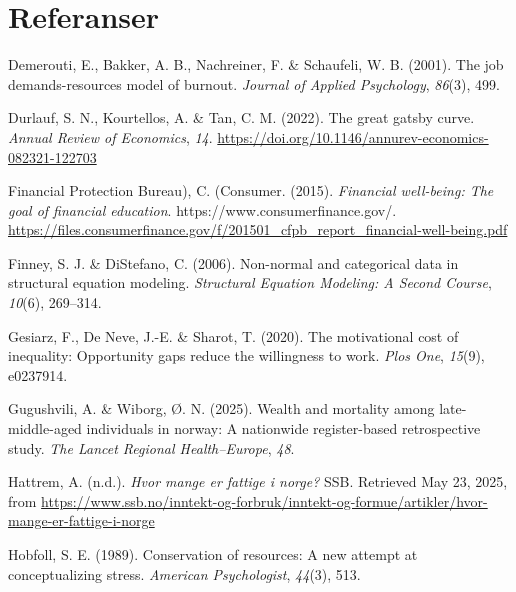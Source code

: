 \documentclass[
  12pt,
  a4paper,
  DIV=11,
  numbers=noendperiod]{scrartcl}
\newlength{\cslhangindent}
\newenvironment{CSLReferences}[2] %
 {\begin{list}{}{%
  \setlength{\itemindent}{0pt}
  \setlength{\leftmargin}{0pt}
  \setlength{\parsep}{0pt}
  \ifodd #1
   \setlength{\leftmargin}{\cslhangindent}
   \setlength{\itemindent}{-1\cslhangindent}
  \fi
  \setlength{\itemsep}{#2\baselineskip}}}
 {\end{list}}
\begin{document}
\newpage

\section*{Referanser}\label{referanser}

\label{refs}
\begin{CSLReferences}{1}{0}
Demerouti, E., Bakker, A. B., Nachreiner, F. \& Schaufeli, W. B. (2001).
The job demands-resources model of burnout. \emph{Journal of Applied
Psychology}, \emph{86}(3), 499.

Durlauf, S. N., Kourtellos, A. \& Tan, C. M. (2022). The great gatsby
curve. \emph{Annual Review of Economics}, \emph{14}.
\url{https://doi.org/10.1146/annurev-economics-082321-122703}

Financial Protection Bureau), C. (Consumer. (2015). \emph{Financial
well-being: The goal of financial education}.
https://www.consumerfinance.gov/.
\url{https://files.consumerfinance.gov/f/201501_cfpb_report_financial-well-being.pdf}

Finney, S. J. \& DiStefano, C. (2006). Non-normal and categorical data
in structural equation modeling. \emph{Structural Equation Modeling: A
Second Course}, \emph{10}(6), 269--314.

Gesiarz, F., De Neve, J.-E. \& Sharot, T. (2020). The motivational cost
of inequality: Opportunity gaps reduce the willingness to work.
\emph{Plos One}, \emph{15}(9), e0237914.

Gugushvili, A. \& Wiborg, Ø. N. (2025). Wealth and mortality among
late-middle-aged individuals in norway: A nationwide register-based
retrospective study. \emph{The Lancet Regional Health--Europe},
\emph{48}.

Hattrem, A. (n.d.). \emph{Hvor mange er fattige i norge?} SSB. Retrieved
May 23, 2025, from
\url{https://www.ssb.no/inntekt-og-forbruk/inntekt-og-formue/artikler/hvor-mange-er-fattige-i-norge}

Hobfoll, S. E. (1989). Conservation of resources: A new attempt at
conceptualizing stress. \emph{American Psychologist}, \emph{44}(3), 513.


\end{CSLReferences}
\end{document}
